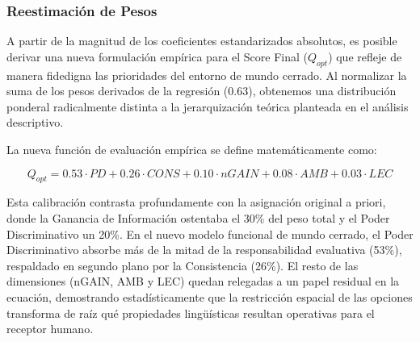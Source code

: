 \subsubsection{Reestimación de Pesos}

A partir de la magnitud de los coeficientes estandarizados absolutos, es posible derivar una nueva formulación empírica para el Score Final ($Q_{opt}$) que refleje de manera fidedigna las prioridades del entorno de mundo cerrado. Al normalizar la suma de los pesos derivados de la regresión ($0.63$), obtenemos una distribución ponderal radicalmente distinta a la jerarquización teórica planteada en el análisis descriptivo.

La nueva función de evaluación empírica se define matemáticamente como:

\[
Q_{opt} = 0.53 \cdot PD + 0.26 \cdot CONS + 0.10 \cdot nGAIN + 0.08 \cdot AMB + 0.03 \cdot LEC
\]

Esta calibración contrasta profundamente con la asignación original a priori, donde la Ganancia de Información ostentaba el 30\% del peso total y el Poder Discriminativo un 20\%. En el nuevo modelo funcional de mundo cerrado, el Poder Discriminativo absorbe más de la mitad de la responsabilidad evaluativa (53\%), respaldado en segundo plano por la Consistencia (26\%). El resto de las dimensiones (nGAIN, AMB y LEC) quedan relegadas a un papel residual en la ecuación, demostrando estadísticamente que la restricción espacial de las opciones transforma de raíz qué propiedades lingüísticas resultan operativas para el receptor humano.
